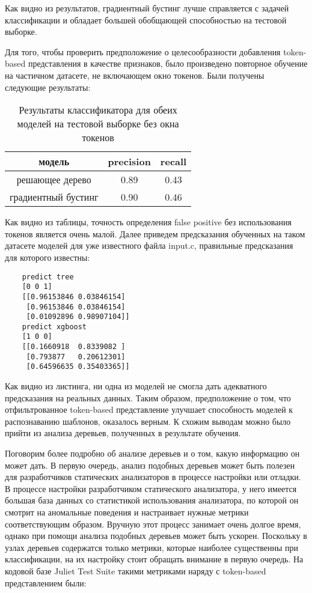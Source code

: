 Как видно из результатов, градиентный бустинг лучше справляется с задачей классификации и обладает большей обобщающей способностью на тестовой выборке.

Для того, чтобы проверить предположение о целесообразности добавления token-based представления в качестве признаков, было произведено повторное обучение на частичном датасете, не включающем окно токенов. Были получены следующие результаты:
\begin{table}[H]
    \centering
    \begin{tabular}{|c|c|c|}
        \hline
        модель              & precision & recall \\ \hline
        решающее дерево     & 0.89      & 0.43   \\ \hline
        градиентный бустинг & 0.90      & 0.46   \\ \hline
    \end{tabular}
    \caption{Результаты классификатора для обеих моделей на тестовой выборке без окна токенов}
\end{table}

Как видно из таблицы, точность определения false positive без использования токенов является очень малой. Далее приведем предсказания обученных на таком датасете моделей для уже известного файла input.c, правильные предсказания для которого известны:

\begin{verbatim}
    predict tree
    [0 0 1]
    [[0.96153846 0.03846154]
     [0.96153846 0.03846154]
     [0.01092896 0.98907104]]
    predict xgboost
    [1 0 0]
    [[0.1660918  0.8339082 ]
     [0.793877   0.20612301]
     [0.64596635 0.35403365]]
\end{verbatim}

Как видно из листинга, ни одна из моделей не смогла дать адекватного предсказания на реальных данных. Таким образом, предположение о том, что отфильтрованное token-based представление улучшает способность моделей к распознаванию шаблонов, оказалось верным. К схожим выводам можно было прийти из анализа деревьев, полученных в результате обучения.

Поговорим более подробно об анализе деревьев и о том, какую информацию он может дать. В первую очередь, анализ подобных деревьев может быть полезен для разработчиков статических анализаторов в процессе настройки или отладки. В процессе настройки разработчиком статического анализатора, у него имеется большая база данных со статистикой использования анализатора, по которой он смотрит на аномальные поведения и настраивает нужные метрики соответствующим образом. Вручную этот процесс занимает очень долгое время, однако при помощи анализа подобных деревьев может быть ускорен. Поскольку в узлах деревьев содержатся только метрики, которые наиболее существенны при классификации, на их настройку стоит обращать внимание в первую очередь. На кодовой базе Juliet Test Suite такими метриками наряду с token-based представлением были:

